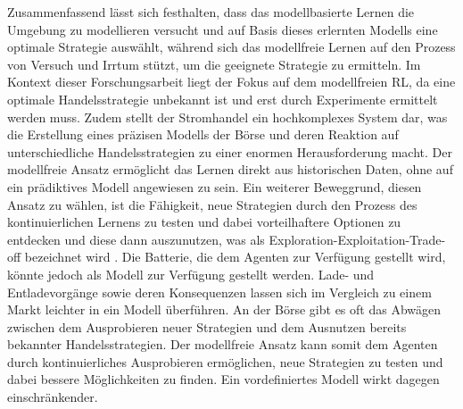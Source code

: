 \documentclass[a4paper, 11pt]{article}
\begin{document}
Zusammenfassend lässt sich festhalten, dass das modellbasierte Lernen die Umgebung zu modellieren versucht und auf Basis dieses erlernten Modells eine optimale Strategie auswählt, während sich das modellfreie Lernen auf den Prozess von Versuch und Irrtum stützt, um die geeignete Strategie zu ermitteln.
Im Kontext dieser Forschungsarbeit liegt der Fokus auf dem modellfreien RL, da eine optimale Handelsstrategie unbekannt ist und erst durch Experimente ermittelt werden muss.
Zudem stellt der Stromhandel ein hochkomplexes System dar, was die Erstellung eines präzisen Modells der Börse und deren Reaktion auf unterschiedliche Handelsstrategien zu einer enormen Herausforderung macht. Der modellfreie Ansatz ermöglicht das Lernen direkt aus historischen Daten, ohne auf ein prädiktives Modell angewiesen zu sein. Ein weiterer Beweggrund, diesen Ansatz zu wählen, ist die Fähigkeit, neue Strategien durch den Prozess des kontinuierlichen Lernens zu testen und dabei vorteilhaftere Optionen zu entdecken und diese dann auszunutzen, was als Exploration-Exploitation-Trade-off bezeichnet wird \cite[S. 3]{sutton_reinforcement_2018}. Die Batterie, die dem Agenten zur Verfügung gestellt wird, könnte jedoch als Modell zur Verfügung gestellt werden. Lade- und Entladevorgänge sowie deren Konsequenzen lassen sich im Vergleich zu einem Markt leichter in ein Modell überführen.
An der Börse gibt es oft das Abwägen zwischen dem Ausprobieren neuer Strategien und dem Ausnutzen bereits bekannter Handelsstrategien. Der modellfreie Ansatz kann somit dem Agenten durch kontinuierliches Ausprobieren ermöglichen, neue Strategien zu testen und dabei bessere Möglichkeiten zu finden. Ein vordefiniertes Modell wirkt dagegen einschränkender. \\
\end{document}
